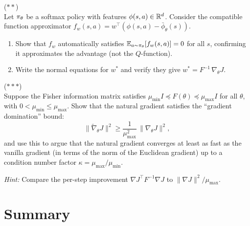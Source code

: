 \documentclass[11pt,a4paper]{article}
\begin{document}
\begin{exercise}
\textnormal{(\(**\))} \\
  Let $\pi_\theta$ be a softmax policy with features $\phi(s,a)
  \in \mathbb{R}^d$. Consider the compatible function approximator $f_w(s,a) =
  w^\top (\phi(s,a) - \bar{\phi}_\theta(s))$.
  \begin{enumerate}[label=(\alph*)]
    \item Show that $f_w$ automatically satisfies
      $\mathbb{E}_{a \sim \pi_\theta}[f_w(s,a)] = 0$ for all $s$,
      confirming it approximates the advantage (not the $Q$-function).
    \item Write the normal equations for $w^*$ and verify they give
      $w^* = F^{-1}\, \nabla_\theta J$.
  \end{enumerate}
\end{exercise}

\begin{exercise}
\textnormal{(\(***\))} \\
  Suppose the Fisher information matrix satisfies $\mu_{\min} I \preceq
  F(\theta) \preceq \mu_{\max} I$ for all $\theta$, with
  $0 < \mu_{\min} \leq \mu_{\max}$. Show that the natural gradient
  satisfies the ``gradient domination'' bound:
  \[
    \|\tilde{\nabla}_\theta J\|^2
    \geq \frac{1}{\mu_{\max}^2}\, \|\nabla_\theta J\|^2,
  \]
  and use this to argue that the natural gradient converges at least as
  fast as the vanilla gradient (in terms of the norm of the Euclidean
  gradient) up to a condition number factor
  $\kappa = \mu_{\max}/\mu_{\min}$.

  \textit{Hint:} Compare the per-step improvement
  $\nabla J^\top F^{-1} \nabla J$ to $\|\nabla J\|^2/\mu_{\max}$.
\end{exercise}

\section{Summary}
\end{document}
